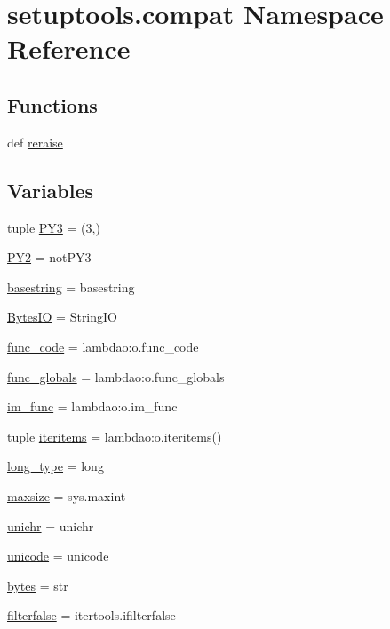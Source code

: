 \hypertarget{namespacesetuptools_1_1compat}{}\section{setuptools.\+compat Namespace Reference}
\label{namespacesetuptools_1_1compat}
\subsection*{Functions}
\begin{DoxyCompactItemize}
\item 
def \hyperlink{namespacesetuptools_1_1compat_ad43de98a2b7b7a95892fb1a1585143db}{reraise}
\end{DoxyCompactItemize}
\subsection*{Variables}
\begin{DoxyCompactItemize}
\item 
tuple \hyperlink{namespacesetuptools_1_1compat_a5bb177da155096a656dc94f715b01bce}{P\+Y3} = (3,)
\item 
\hyperlink{namespacesetuptools_1_1compat_a2370a8b5d27d554ce9ff2f14408b30c2}{P\+Y2} = not\+P\+Y3
\item 
\hyperlink{namespacesetuptools_1_1compat_a547dfbdc81b05eb080fe204534c8e6e0}{basestring} = basestring
\item 
\hyperlink{namespacesetuptools_1_1compat_a9f457ef6009c81f6e9706c67f512d1f9}{Bytes\+I\+O} = String\+I\+O
\item 
\hyperlink{namespacesetuptools_1_1compat_a2be386db754d1c52daa821a1fef8c721}{func\+\_\+code} = lambdao\+:o.\+func\+\_\+code
\item 
\hyperlink{namespacesetuptools_1_1compat_aabc27d23bded874134274af780a04acd}{func\+\_\+globals} = lambdao\+:o.\+func\+\_\+globals
\item 
\hyperlink{namespacesetuptools_1_1compat_a6c9af30b31d6e2373266812dda216da9}{im\+\_\+func} = lambdao\+:o.\+im\+\_\+func
\item 
tuple \hyperlink{namespacesetuptools_1_1compat_a74b177248b3d24fd60022c543394af82}{iteritems} = lambdao\+:o.\+iteritems()
\item 
\hyperlink{namespacesetuptools_1_1compat_ad933341305d2faff785bca7440f0afdc}{long\+\_\+type} = long
\item 
\hyperlink{namespacesetuptools_1_1compat_a4ac23c230dbabba4294e386388312cf3}{maxsize} = sys.\+maxint
\item 
\hyperlink{namespacesetuptools_1_1compat_a02de19a1d6360e1e133acab1ad04e3f4}{unichr} = unichr
\item 
\hyperlink{namespacesetuptools_1_1compat_a2a70bfc962c4e2c5aa29394fd8a158bf}{unicode} = unicode
\item 
\hyperlink{namespacesetuptools_1_1compat_acff0f7fcfe07ba742dc73bb1c43b15a9}{bytes} = str
\item 
\hyperlink{namespacesetuptools_1_1compat_aff6dc265346ae8267699ea663087bb10}{filterfalse} = itertools.\+ifilterfalse
\end{DoxyCompactItemize}


